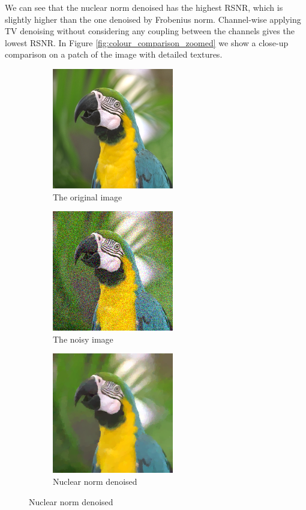 \documentclass{article}
\begin{document}
We can see that the nuclear norm denoised has the highest RSNR, which is slightly higher than the one denoised by Frobenius norm. Channel-wise applying TV denoising without considering any coupling between the channels gives the lowest RSNR. In Figure \ref{fig:colour_comparison_zoomed} we show a close-up comparison on a patch of the image with detailed textures.

\begin{figure}[ht]     
    \centering
    \begin{subfigure}[b]{0.24\textwidth}
        \centering
        \includegraphics[scale=2.5,trim={80 117 78 45},clip=true]{../images/colour.png}
        \caption{The original image}
        \label{fig:Zoomedcolour}
    \end{subfigure}
    \begin{subfigure}[b]{0.24\textwidth}
        \centering
        \includegraphics[scale=2.5,trim={80 117 78 45},clip=true]{../images/noisy_colour.png}
        \caption{The noisy image}
        \label{fig:Zoomednoisecolour}
    \end{subfigure}
    \begin{subfigure}[b]{0.24\textwidth}
        \centering
        \includegraphics[scale=2.5,trim={80 117 78 45},clip=true]{../images/TNVdenoised_colour.png}
        \caption{Nuclear norm denoised}
        \label{fig:ZoomedNuclearNormdenoised_colour}
    \end{subfigure}


\end{figure}
\end{document}
